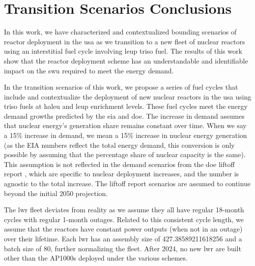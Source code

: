 \section{Transition Scenarios Conclusions}
\label{sec:dep_conc}


In this work, we have characterized and contextualized bounding scenarios of reactor deployment in the \gls{usa} as we transition to a new fleet of nuclear reactors using an interstitial fuel cycle involving \gls{leup} \gls{triso} fuel. The results of this work show that the reactor deployment scheme has an understandable and identifiable impact on the \gls{swu} required to meet the energy demand.

In the transition scenarios of this work, we propose a series of fuel cycles that include and contextualize the deployment of new nuclear reactors in the \gls{usa} using \gls{triso} fuels at \gls{haleu} and \gls{leup} enrichment levels. These fuel cycles meet the energy demand growths predicted by the \gls{eia} and \gls{doe}. The increase in demand assumes that nuclear energy's generation share remains constant over time. When we say a 15$\%$ increase in demand, we mean a 15$\%$ increase in nuclear energy generation (as the EIA numbers \cite{eia_aeo_2023} reflect the total energy demand, this conversion is only possible by assuming that the percentage share of nuclear capacity is the same). This assumption is not reflected in the demand scenarios from the \gls{doe} liftoff report \cite{julie_liftoff_pathways_2024}, which are specific to nuclear deployment increases, and the number is agnostic to the total increase. The liftoff report scenarios are assumed to continue beyond the initial 2050 projection.

The \gls{lwr} fleet deviates from reality as we assume they all have regular 18-month cycles with regular 1-month outages. Related to this consistent cycle length, we assume that the reactors have constant power outputs (when not in an outage) over their lifetime. Each \gls{lwr} has an assembly size of 427.38589211618256 and a batch size of 80,  further normalizing the fleet. After 2024, no new \gls{lwr} are built other than the AP1000s deployed under the various schemes.

